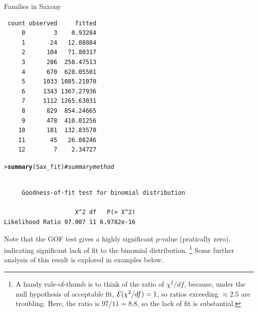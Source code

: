 \documentclass[10pt,krantz2]{krantz}\usepackage[]{graphicx}\usepackage[]{color}
\makeatletter
\newcommand{\hlcom}[1]{\textcolor[rgb]{0.678,0.584,0.686}{\textit{#1}}}%
\newcommand{\hlstd}[1]{\textcolor[rgb]{0.345,0.345,0.345}{#1}}%
\newcommand{\hlkwd}[1]{\textcolor[rgb]{0.737,0.353,0.396}{\textbf{#1}}}%
\newenvironment{kframe}{%
 \def\at@end@of@kframe{}%
 \ifinner\ifhmode%
  \def\at@end@of@kframe{\end{minipage}}%
  \begin{minipage}{\columnwidth}%
 \fi\fi%
 \def\FrameCommand##1{\hskip\@totalleftmargin \hskip-\fboxsep
 \colorbox{shadecolor}{##1}\hskip-\fboxsep
     \hskip-\linewidth \hskip-\@totalleftmargin \hskip\columnwidth}%
 \MakeFramed {\advance\hsize-\width
   \@totalleftmargin\z@ \linewidth\hsize
   \@setminipage}}%
 {\par\unskip\endMakeFramed%
 \at@end@of@kframe}
\newenvironment{knitrout}{}{} %
\renewenvironment{knitrout}{\small\renewcommand{\baselinestretch}{.85}}{} %
\makeatother
\begin{document}
\begin{Example}[saxfit]{Families in Saxony}
\begin{knitrout}
\begin{kframe}
\begin{verbatim}
 count observed     fitted
     0        3    0.93284
     1       24   12.08884
     2      104   71.80317
     3      286  258.47513
     4      670  628.05501
     5     1033 1085.21070
     6     1343 1367.27936
     7     1112 1265.63031
     8      829  854.24665
     9      478  410.01256
    10      181  132.83570
    11       45   26.08246
    12        7    2.34727
\end{verbatim}
\begin{alltt}
\hlstd{> }\hlkwd{summary}\hlstd{(Sax_fit)}   \hlcom{# summary method}
\end{alltt}
\begin{verbatim}

	 Goodness-of-fit test for binomial distribution

                    X^2 df   P(> X^2)
Likelihood Ratio 97.007 11 6.9782e-16
\end{verbatim}
\end{kframe}
\end{knitrout}
Note that the GOF test gives a highly significant $p$-value
(pratically zero), indicating
significant lack of fit to the binomial distribution.%
\footnote{
A handy rule-of-thumb is to think of the ratio of $\chi^2 / df$,
because, under the null hypothesis of acceptable fit, $\mathcal{E} (\chi^2 / df) = 1$,
so ratios exceeding $\approx 2.5$ are troubling.
Here, the ratio is $97 / 11 = 8.8$, so the lack of fit is substantial.
}
Some further analysis of this result is explored in examples below.
\end{Example}
\end{document}
